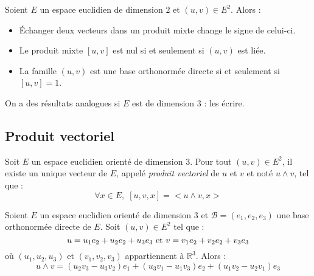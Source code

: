 \documentclass[french,11pt,twoside]{VcCours}
\begin{document}
\begin{Proposition}{} Soient $E$ un espace euclidien de dimension $2$ et $(u,v) \in E^2$. Alors :
\begin{itemize}
\item Échanger deux vecteurs dans un produit mixte change le signe de celui-ci.
\item Le produit mixte $[u,v]$ est nul si et seulement si $(u,v)$ est liée.
\item La famille $(u,v)$ est une base orthonormée directe si et seulement si $[u,v]=1$.
\end{itemize}
\end{Proposition}

\begin{ApplicationDirecte}{} On a des résultats analogues si $E$ est de dimension $3$ : les écrire.
\end{ApplicationDirecte}

\subsection{Produit vectoriel}

\begin{TheoremeDefinition}{} Soit $E$ un espace euclidien orienté de dimension $3$. Pour tout $(u,v) \in E^2$, il existe un unique vecteur de $E$, appelé \emph{produit vectoriel} de $u$ et $v$ et noté $u \wedge v$, tel que :
$$ \forall x \in E, \; [u,v,x]=<u \wedge v, x>$$
\end{TheoremeDefinition}{}

\begin{Demonstration}{}
\vspace*{5cm}
\end{Demonstration}

\begin{Proposition}{} Soient $E$ un espace euclidien orienté de dimension $3$ et $\mathcal{B}=(e_1,e_2,e_3)$ une base orthonormée directe de $E$. Soit $(u,v) \in E^2$ tel que :
$$ u= u_1 e_2 + u_2e_2 + u_3e_3 \hbox{ et } v= v_1 e_2 + v_2e_2 + v_3e_3$$
où $(u_1,u_2,u_3)$ et $(v_1,v_2,v_3)$ appartiennent à $\mathbb{R}^3$. Alors :
$$ u \wedge v = (u_2 v_3-u_3v_2) e_1 + (u_3v_1-u_1 v_3) e_2 + (u_1v_2-u_2v_1) e_3 $$
\end{Proposition}
\end{document}
